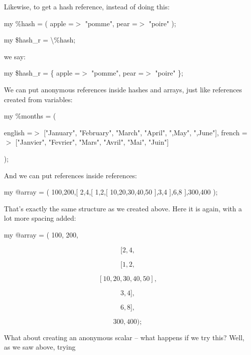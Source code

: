 \documentclass[a4paper,11pt]{book}
\begin{document}
\noindent 

\noindent Likewise, to get a hash reference, instead of doing this:

\noindent 

\noindent 

\noindent my \%hash = ( apple =$>$ "pomme", pear =$>$ "poire" );

\noindent my \$hash\_r = \textbackslash \%hash;

\noindent 

\noindent we say:

\noindent 

\noindent my \$hash\_r = \{ apple =$>$ "pomme", pear =$>$ "poire" \};

\noindent 

\noindent We can put anonymous references inside hashes and arrays, just like references created from variables:

\noindent 

\noindent 

\noindent my \%months  = (

\noindent english =$>$ ["January", "February", "March", "April", ",May", ",June"], french  =$>$ ["Janvier", "Fevrier", "Mars", "Avril", "Mai", "Juin"]

\noindent );

\noindent 

\noindent And we can put references inside references:

\noindent 

\noindent 

\noindent my @array = ( 100,200,[ 2,4,[ 1,2,[ 10,20,30,40,50 ],3,4 ],6,8 ],300,400 );

\noindent 

\noindent That's exactly the same structure as we created above. Here it is again, with a lot more spacing added:

\noindent 

\noindent 

\noindent my @array = ( 100, 200,

\[[ 2, 4,\] 

\[[ 1, 2,\] 

\[[ 10, 20, 30, 40, 50 ],\] 

\[3,4 ],\] 

\[6,8 ],\] 

\[300, 400 );\] 


\noindent What about creating an anonymous scalar -- what happens if we try this? Well, as we saw above, trying
\end{document}
